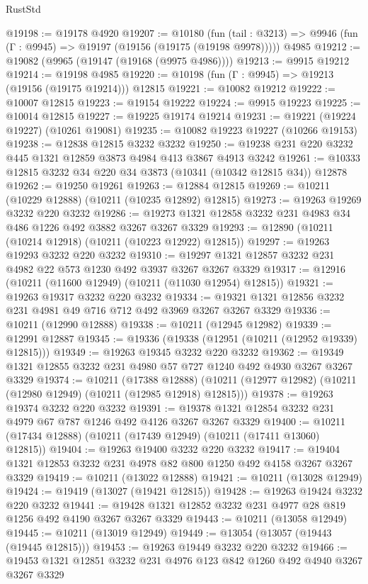 \begin{lexlean}{RustStd}
\begin{coremodule}
@19198 := @19178 @4920
@19207 := @10180
    (fun (tail : @3213) => @9946 (fun (Γ : @9945) => @19197 (@19156 (@19175 (@19198 @9978)))))
    @4985
@19212 := @19082 (@9965 (@19147 (@19168 (@9975 @4986))))
@19213 := @9915 @19212
@19214 := @19198 @4985
@19220 := @10198 (fun (Γ : @9945) => @19213 (@19156 (@19175 @19214))) @12815
@19221 := @10082 @19212
@19222 := @10007 @12815
@19223 := @19154 @19222
@19224 := @9915 @19223
@19225 := @10014 @12815
@19227 := @19225 @19174 @19214
@19231 := @19221 (@19224 @19227) (@10261 @19081)
@19235 := @10082 @19223 @19227 (@10266 @19153)
@19238 := @12838 @12815 @3232 @3232
@19250 := @19238 @231 @220 @3232 @445 @1321 @12859 @3873 @4984 @413 @3867 @4913 @3242
@19261 := @10333 @12815 @3232 @34 @220 @34 @3873 (@10341 (@10342 @12815 @34)) @12878
@19262 := @19250 @19261
@19263 := @12884 @12815
@19269 := @10211 (@10229 @12888) (@10211 (@10235 @12892) @12815)
@19273 := @19263 @19269 @3232 @220 @3232
@19286 := @19273 @1321 @12858 @3232 @231 @4983 @34 @486 @1226 @492 @3882 @3267 @3267 @3329
@19293 := @12890 (@10211 (@10214 @12918) (@10211 (@10223 @12922) @12815))
@19297 := @19263 @19293 @3232 @220 @3232
@19310 := @19297 @1321 @12857 @3232 @231 @4982 @22 @573 @1230 @492 @3937 @3267 @3267 @3329
@19317 := @12916 (@10211 (@11600 @12949) (@10211 (@11030 @12954) @12815))
@19321 := @19263 @19317 @3232 @220 @3232
@19334 := @19321 @1321 @12856 @3232 @231 @4981 @49 @716 @712 @492 @3969 @3267 @3267 @3329
@19336 := @10211 (@12990 @12888)
@19338 := @10211 (@12945 @12982)
@19339 := @12991 @12887
@19345 := @19336 (@19338 (@12951 (@10211 (@12952 @19339) @12815)))
@19349 := @19263 @19345 @3232 @220 @3232
@19362 := @19349 @1321 @12855 @3232 @231 @4980 @57 @727 @1240 @492 @4930 @3267 @3267 @3329
@19374 := @10211
    (@17388 @12888)
    (@10211 (@12977 @12982) (@10211 (@12980 @12949) (@10211 (@12985 @12918) @12815)))
@19378 := @19263 @19374 @3232 @220 @3232
@19391 := @19378 @1321 @12854 @3232 @231 @4979 @67 @787 @1246 @492 @4126 @3267 @3267 @3329
@19400 := @10211 (@17434 @12888) (@10211 (@17439 @12949) (@10211 (@17411 @13060) @12815))
@19404 := @19263 @19400 @3232 @220 @3232
@19417 := @19404 @1321 @12853 @3232 @231 @4978 @82 @800 @1250 @492 @4158 @3267 @3267 @3329
@19419 := @10211 (@13022 @12888)
@19421 := @10211 (@13028 @12949)
@19424 := @19419 (@13027 (@19421 @12815))
@19428 := @19263 @19424 @3232 @220 @3232
@19441 := @19428 @1321 @12852 @3232 @231 @4977 @28 @819 @1256 @492 @4190 @3267 @3267 @3329
@19443 := @10211 (@13058 @12949)
@19445 := @10211 (@13019 @12949)
@19449 := @13054 (@13057 (@19443 (@19445 @12815)))
@19453 := @19263 @19449 @3232 @220 @3232
@19466 := @19453 @1321 @12851 @3232 @231 @4976 @123 @842 @1260 @492 @4940 @3267 @3267 @3329

\end{coremodule}
\end{lexlean}
